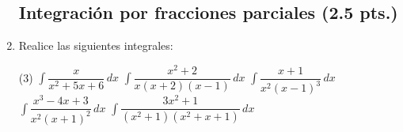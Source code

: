 \documentclass[letterpaper,11pt]{article}
\begin{document}
\begin{enumerate}
\subsection*{Integración por fracciones parciales (2.5 pts.)}
\item  Realice las siguientes integrales:
\begin{tasks}(3)
\task $\displaystyle \int \dfrac{x}{x^2 + 5x + 6} \, dx$
\task $\displaystyle \int \dfrac{x^2 +2}{x(x+2)(x-1)} \, dx$
\task $\displaystyle \int \dfrac{x + 1}{x^2(x-1)^3} \, dx$
\task $\displaystyle \int \dfrac{x^3 - 4x + 3}{x^2(x+1)^2} \, dx$
\task $\displaystyle \int  \dfrac{3x^2 + 1}{(x^2 +1 ) (x^2 + x +1)} \, dx$
\end{tasks}

 \end{enumerate}
\end{document}
